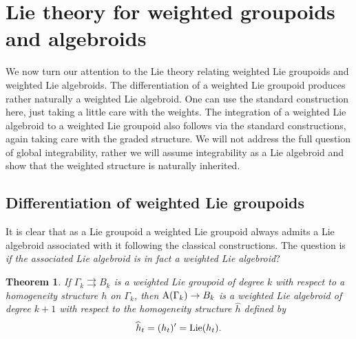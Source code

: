 \documentclass[10pt,a4paper]{amsart}
\newcommand{\rmA}{\textnormal{A}}
\newcommand{\Lie}{\textnormal{Lie}}
\numberwithin{equation}{section}
\newtheorem{Theorem}{Theorem}[section]
\begin{document}
\section{Lie theory for weighted groupoids and algebroids}\label{sec:Lie theory}

We now turn our attention to the Lie theory relating weighted Lie groupoids and weighted Lie algebroids. The dif\/ferentiation of a weighted Lie groupoid produces rather naturally a weighted Lie algebroid. One can use the standard construction here, just taking a little care with the weights. The integration of a weighted Lie algebroid to a weighted Lie groupoid also follows via the standard constructions, again taking care with the graded structure. We will not address the full question of global integrability, rather we will assume integrability as a Lie algebroid and show that the weighted structure is naturally inherited.

\subsection{Dif\/ferentiation of weighted Lie groupoids}
It is clear  that as a Lie groupoid a weighted Lie groupoid always admits a Lie algebroid associated with it following the classical constructions. The question is \emph{if the associated Lie algebroid is in fact a weighted Lie algebroid}?

\begin{Theorem}\label{thm:groupoids to algebroids}
If $\Gamma_{k} \rightrightarrows B_{k}$ is a weighted Lie groupoid of degree $k$ with respect to a homogeneity structure $h$ on $\Gamma_k$, then $\rmA(\Gamma_{k}) \rightarrow B_{k}$ is a weighted Lie algebroid of degree $k+1$ with respect to the homogeneity structure $\widehat{h}$ defined by
\begin{gather}\label{wh}
\widehat{h}_t=(h_t)'=\Lie(h_t) .
\end{gather}
\end{Theorem}
\end{document}
